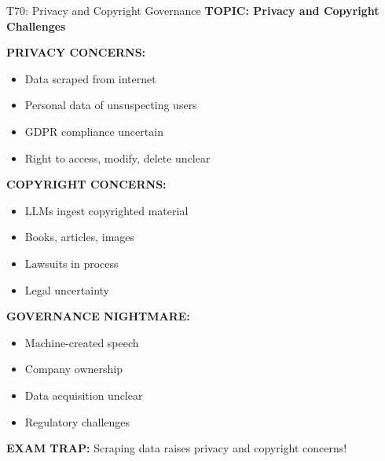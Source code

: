 \documentclass[8pt]{beamer}
\begin{document}
	\begin{frame}{T70: Privacy and Copyright Governance}
		\fontsize{6.5}{7.5}\selectfont
		\textbf{TOPIC: Privacy and Copyright Challenges}
		
		\vspace{0.1cm}
		\textbf{PRIVACY CONCERNS:}
		\begin{itemize}
			\item Data scraped from internet
			\item Personal data of unsuspecting users
			\item GDPR compliance uncertain
			\item Right to access, modify, delete unclear
		\end{itemize}
		
		\vspace{0.1cm}
		\textbf{COPYRIGHT CONCERNS:}
		\begin{itemize}
			\item LLMs ingest copyrighted material
			\item Books, articles, images
			\item Lawsuits in process
			\item Legal uncertainty
		\end{itemize}
		
		\vspace{0.1cm}
		\textbf{GOVERNANCE NIGHTMARE:}
		\begin{itemize}
			\item Machine-created speech
			\item Company ownership
			\item Data acquisition unclear
			\item Regulatory challenges
		\end{itemize}
		
		\textcolor{myred}{\textbf{EXAM TRAP:}} Scraping data raises \textcolor{myblue}{privacy and copyright concerns}!
	\end{frame}
	
	
\end{document}
